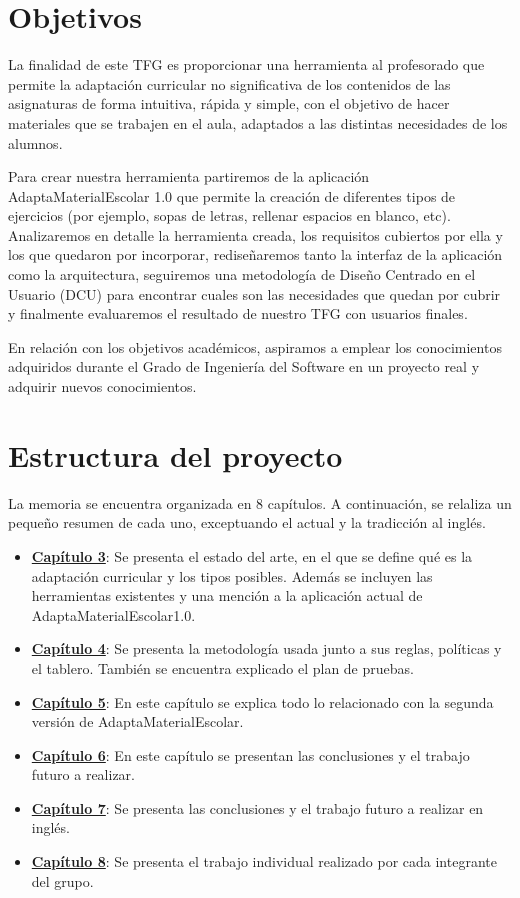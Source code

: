 \section{Objetivos}\label{cap:objetivos}
La finalidad de este TFG es proporcionar una herramienta al profesorado que permite la adaptación curricular no significativa de los contenidos de las asignaturas de forma intuitiva, rápida y simple, con el objetivo de hacer materiales que se trabajen en el aula, adaptados a las distintas necesidades de los alumnos.

Para crear nuestra herramienta partiremos de la aplicación AdaptaMaterialEscolar 1.0  que permite la creación de diferentes tipos de ejercicios (por ejemplo, sopas de letras, rellenar espacios en blanco, etc). Analizaremos en detalle la herramienta creada, los requisitos cubiertos por ella y los que quedaron por incorporar, rediseñaremos tanto la interfaz de la aplicación como la arquitectura, seguiremos una metodología de Diseño Centrado en el Usuario (DCU) para encontrar cuales son las necesidades que quedan por cubrir y finalmente evaluaremos el resultado de nuestro TFG con usuarios finales.
 
En relación con los objetivos académicos, aspiramos a emplear los conocimientos adquiridos durante el Grado de Ingeniería del Software en un proyecto real y adquirir nuevos conocimientos.



\section{Estructura del proyecto}\label{cap:estructura}
La memoria se encuentra organizada en 8 capítulos. A continuación, se relaliza un pequeño resumen de cada uno, exceptuando el actual y la tradicción al inglés.
\begin{itemize}
    \item \textbf{\hyperref[cap:estadoDelArte]{Capítulo 3}}: Se presenta el estado del arte, en el que se define qué es la adaptación curricular y los tipos posibles. Además se incluyen las herramientas existentes y una mención a la aplicación actual de  AdaptaMaterialEscolar1.0.
    \item \textbf{\hyperref[cap:metodologia]{Capítulo 4}}: Se presenta la metodología usada junto a sus reglas, políticas y el tablero. También se encuentra explicado el plan de pruebas.
    \item \textbf{\hyperref[cap:AdaptaMaterialEscolar2.0]{Capítulo 5}}: En este capítulo se explica todo lo relacionado con la segunda versión de AdaptaMaterialEscolar.
    \item \textbf{\hyperref[cap:conclusiones]{Capítulo 6}}: En este capítulo se presentan las conclusiones y el trabajo futuro a realizar.
    \item \textbf{\hyperref[cap:conclusions]{Capítulo 7}}: Se presenta las conclusiones y el trabajo futuro a realizar en inglés.
    \item \textbf{\hyperref[cap:TrabajoIndividual]{Capítulo 8}}: Se presenta el trabajo individual realizado por cada integrante del grupo.
\end{itemize}